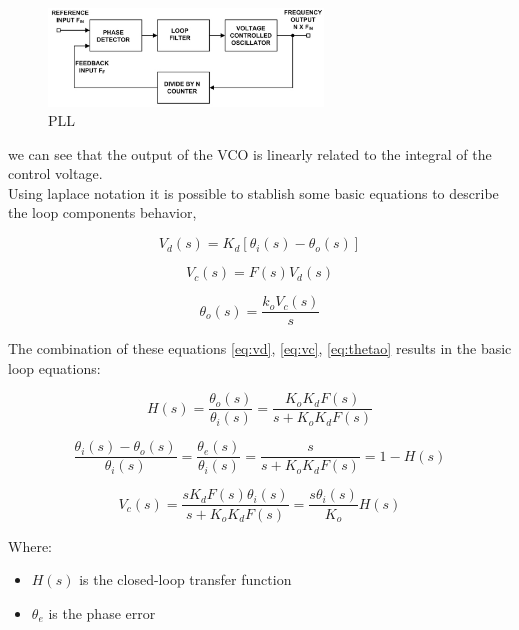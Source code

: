 \begin{figure}[htbp]
    \centering
    \includegraphics[width=0.65\textwidth]{./figures/pll.eps}
    \caption{ PLL
    \label{fig:pll2}}
\end{figure}

we can see that the output of the VCO is linearly related to the integral of the
control voltage.\\

Using laplace notation it is possible to stablish some basic equations to
describe the loop components behavior,

\begin{equation}
    V_d(s)=K_d[\theta_i(s) - \theta_o(s)]
    \label{eq:vd}
\end{equation}

\begin{equation}
    V_c(s)=F(s)V_d(s)
    \label{eq:vc}
\end{equation}

\begin{equation}
    \theta_o(s)=\frac{k_oV_c(s)}{s}
    \label{eq:thetao}
\end{equation}

The combination of these equations \ref{eq:vd}, \ref{eq:vc}, \ref{eq:thetao}
results in the basic loop equations:


\begin{equation}
    H(s)= \frac{\theta_o(s)}{\theta_i(s)}=
    \frac{K_oK_dF(s)}{s + K_oK_dF(s)}
    \label{eq:gentf}
\end{equation}

\begin{equation}
    \frac{\theta_i(s)-\theta_o(s)}{\theta_i(s)}=
    \frac{\theta_e(s)}{\theta_i(s)}=
    \frac{s}{s+K_oK_dF(s)}=1-H(s)
    \label{eq:pherr}
\end{equation}

\begin{equation}
    V_c(s)=\frac{sK_dF(s)\theta_i(s)}{s+K_oK_dF(s)}=
    \frac{s\theta_i(s)}{K_o}H(s)
    \label{eq:vchs}
\end{equation}

Where:

\begin{itemize}
    \item $H(s)$ is the closed-loop transfer function
    \item $\theta_e$ is the phase error
\end{itemize}

